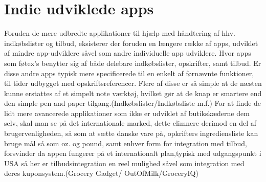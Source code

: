 \section{Indie udviklede apps}
Foruden de mere udbredte applikationer til hjælp med håndtering af hhv. indkøbslister og tilbud, eksisterer der foruden en længere række af apps, udviklet af mindre app-udviklere såvel som andre individuelle app udviklere.
Hvor apps som føtex's benytter sig af både delebare indkøbslister, opskrifter, samt tilbud. Er disse andre apps typisk mere specificerede til en enkelt af førnævnte funktioner, til tider udbygget med opskriftsreferencer.
Flere af disse er så simple at de næsten kunne erstattes af et simpelt note værktøj, hvilket gør at de knap er smartere end den simple pen and paper tilgang.(Indkøbslister/Indkøbsliste m.f.) For at finde de lidt mere avancerede applikationer som ikke er udviklet af butikskæderne dem selv, skal man se på det internationale marked, dette elimnere derimod en del af brugervenligheden, så som at sætte danske vare på, opkrifters ingrediensliste kan bruge mål så som oz. og pound, samt enhver form for integration med tilbud, forsvinder da appen fungerer på et internationalt plan,typisk med udgangspunkt i USA så her er tilbudsintegration en reel mulighed såvel som integration med deres kuponsystem.(Grocery Gadget/ OutOfMilk/GroceryIQ)
